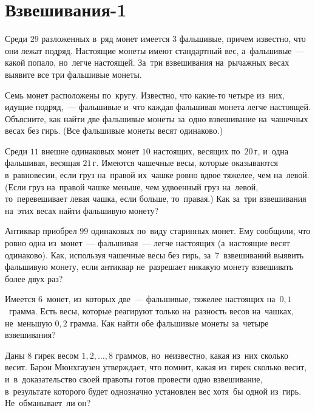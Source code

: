 
\section*{Взвешивания-1}


\begin{problems}

\item
Среди $29$ разложенных в~ряд монет имеется $3$ фальшивые, причем известно, что
они лежат подряд.
Настоящие монеты имеют стандартный вес, а~фальшивые~--- какой попало, но~легче
настоящей.
За~три взвешивания на~рычажных весах выявите все три фальшивые монеты.

\item
Семь монет расположены по~кругу.
Известно, что какие-то четыре из~них, идущие подряд,~--- фальшивые и~что каждая
фальшивая монета легче настоящей.
Объясните, как найти две фальшивые монеты за~одно взвешивание на~чашечных весах
без гирь.
(Все фальшивые монеты весят одинаково.)

\item
Среди $11$ внешне одинаковых монет $10$ настоящих, весящих по~$20\,\text{г}$,
и~одна фальшивая, весящая $21\,\text{г}$.
Имеются чашечные весы, которые оказываются в~равновесии, если груз на~правой
их~чашке ровно вдвое тяжелее, чем на~левой.
(Если груз на~правой чашке меньше, чем удвоенный груз на~левой, то~перевешивает
левая чашка, если больше, то~правая.)
Как за~три взвешивания на~этих весах найти фальшивую монету?

\item
Антиквар приобрел $99$ одинаковых по~виду старинных монет.
Ему сообщили, что ровно одна из~монет~--- фальшивая~--- легче настоящих
(а~настоящие весят одинаково).
Как, используя чашечные весы без гирь, за~$7$~взвешиваний выявить фальшивую
монету, если антиквар не~разрешает никакую монету взвешивать более двух раз?

\item
Имеется $6$~монет, из~которых две~--- фальшивые, тяжелее настоящих
на~$0{,}1$~грамма.
Есть весы, которые реагируют только на~разность весов на~чашках, не~меньшую
$0{,}2$ грамма.
Как найти обе фальшивые монеты за~четыре взвешивания?

\item
Даны $8$ гирек весом $1, 2, \ldots, 8$ граммов, но~неизвестно, какая из~них
сколько весит.
Барон Мюнхгаузен утверждает, что помнит, какая из~гирек сколько весит,
и~в~доказательство своей правоты готов провести одно взвешивание, в~результате
которого будет однозначно установлен вес хотя~бы одной из~гирь.
Не~обманывает~ли он?


\end{problems}

